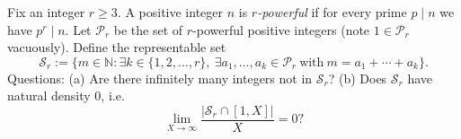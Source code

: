 Fix an integer \(r\ge 3\). A positive integer \(n\) is \emph{\(r\)-powerful} if for every prime \(p\mid n\) we have \(p^r\mid n\).
Let \(\mathcal P_r\) be the set of \(r\)-powerful positive integers (note \(1\in\mathcal P_r\) vacuously).
Define the representable set
\[\mathcal S_r := \Big\{m\in\mathbb N: \exists k\in\{1,2,\dots,r\},\ \exists a_1,\dots,a_k\in\mathcal P_r\ \text{with}\ m=a_1+\cdots+a_k\Big\}.
\]
Questions:
(a) Are there infinitely many integers not in \(\mathcal S_r\)?
(b) Does \(\mathcal S_r\) have natural density 0, i.e.
\[\lim_{X\to\infty} \frac{|\mathcal S_r\cap [1,X]|}{X}=0?\]
